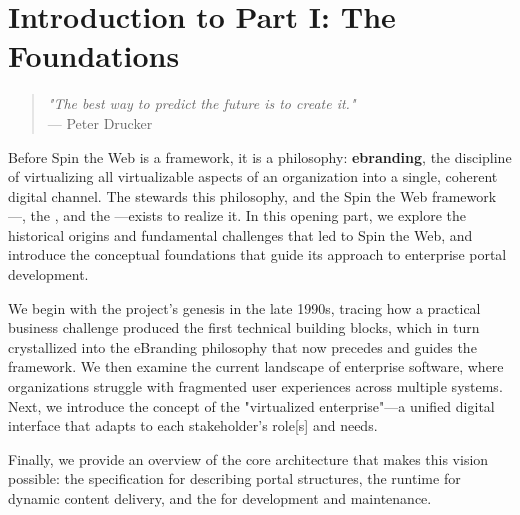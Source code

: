 
\chapter*{Introduction to Part I: The Foundations}
\label{part:foundations}

\begin{quote}
\textit{"The best way to predict the future is to create it."} \\
— Peter Drucker
\end{quote}

Before Spin the Web is a framework, it is a philosophy: \textbf{\gls{ebranding}}, the discipline of virtualizing all virtualizable aspects of an organization into a single, coherent digital channel. The \organization{} stewards this philosophy, and the Spin the Web framework---\wbol{}, the \webspinner{}, and the \studio{}---exists to realize it. In this opening part, we explore the historical origins and fundamental challenges that led to Spin the Web, and introduce the conceptual foundations that guide its approach to enterprise portal development.

We begin with the project's genesis in the late 1990s, tracing how a practical business challenge produced the first technical building blocks, which in turn crystallized into the eBranding philosophy that now precedes and guides the framework. We then examine the current landscape of enterprise software, where organizations struggle with fragmented user experiences across multiple systems. Next, we introduce the concept of the "virtualized enterprise"—a unified digital interface that adapts to each stakeholder's role[s] and needs.

Finally, we provide an overview of the core architecture that makes this vision possible: the \wbol{} specification for describing portal structures, the \webspinner{} runtime for dynamic content delivery, and the \studio{} for development and maintenance.

